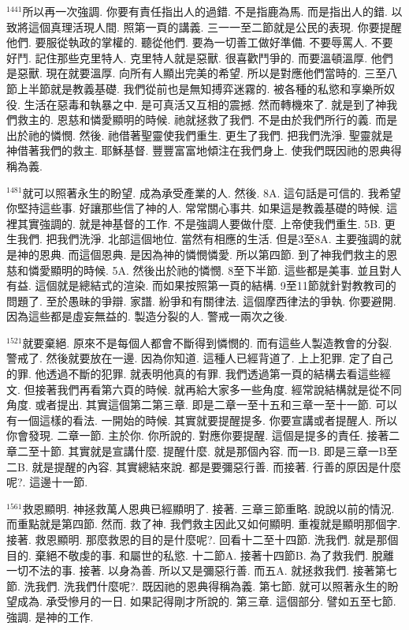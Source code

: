 \documentclass{book}
\begin{document}
$^{1441}$所以再一次強調.
你要有責任指出人的過錯.
不是指鹿為馬.
而是指出人的錯.
以致將這個真理活現人間.
照第一頁的講義.
三一一至二節就是公民的表現.
你要提醒他們.
要服從執政的掌權的.
聽從他們.
要為一切善工做好準備.
不要辱罵人.
不要好鬥.
記住那些克里特人.
克里特人就是惡獸.
很喜歡鬥爭的.
而要溫頓溫厚.
他們是惡獸.
現在就要溫厚.
向所有人顯出完美的希望.
所以是對應他們當時的.
三至八節上半節就是教義基礎.
我們從前也是無知搏弈迷霧的.
被各種的私慾和享樂所奴役.
生活在惡毒和執暴之中.
是可真活又互相的震撼.
然而轉機來了.
就是到了神我們救主的.
恩慈和憐愛顯明的時候.
祂就拯救了我們.
不是由於我們所行的義.
而是出於祂的憐憫.
然後.
祂借著聖靈使我們重生.
更生了我們.
把我們洗淨.
聖靈就是神借著我們的救主.
耶穌基督.
豐豐富富地傾注在我們身上.
使我們既因祂的恩典得稱為義.

$^{1481}$就可以照著永生的盼望.
成為承受產業的人.
然後.
8A.
這句話是可信的.
我希望你堅持這些事.
好讓那些信了神的人.
常常關心事共.
如果這是教義基礎的時候.
這裡其實強調的.
就是神基督的工作.
不是強調人要做什麼.
上帝使我們重生.
5B.
更生我們.
把我們洗淨.
北部這個地位.
當然有相應的生活.
但是3至8A.
主要強調的就是神的恩典.
而這個恩典.
是因為神的憐憫憐愛.
所以第四節.
到了神我們救主的恩慈和憐愛顯明的時候.
5A.
然後出於祂的憐憫.
8至下半節.
這些都是美事.
並且對人有益.
這個就是總結式的渲染.
而如果按照第一頁的結構.
9至11節就針對教教司的問題了.
至於愚昧的爭辯.
家譜.
紛爭和有關律法.
這個摩西律法的爭執.
你要避開.
因為這些都是虛妄無益的.
製造分裂的人.
警戒一兩次之後.

$^{1521}$就要棄絕.
原來不是每個人都會不斷得到憐憫的.
而有這些人製造教會的分裂.
警戒了.
然後就要放在一邊.
因為你知道.
這種人已經背道了.
上上犯罪.
定了自己的罪.
他透過不斷的犯罪.
就表明他真的有罪.
我們透過第一頁的結構去看這些經文.
但接著我們再看第六頁的時候.
就再給大家多一些角度.
經常說結構就是從不同角度.
或者提出.
其實這個第二第三章.
即是二章一至十五和三章一至十一節.
可以有一個這樣的看法.
一開始的時候.
其實就要提醒提多.
你要宣講或者提醒人.
所以你會發現.
二章一節.
主於你.
你所說的.
對應你要提醒.
這個是提多的責任.
接著二章二至十節.
其實就是宣講什麼.
提醒什麼.
就是那個內容.
而一B.
即是三章一B至二B.
就是提醒的內容.
其實總結來說.
都是要彌惡行善.
而接著.
行善的原因是什麼呢?.
這邊十一節.

$^{1561}$救恩顯明.
神拯救萬人恩典已經顯明了.
接著.
三章三節重略.
說說以前的情況.
而重點就是第四節.
然而.
救了神.
我們救主因此又如何顯明.
重複就是顯明那個字.
接著.
救恩顯明.
那麼救恩的目的是什麼呢?.
回看十二至十四節.
洗我們.
就是那個目的.
棄絕不敬虔的事.
和屬世的私慾.
十二節A.
接著十四節B.
為了救我們.
脫離一切不法的事.
接著.
以身為善.
所以又是彌惡行善.
而五A.
就拯救我們.
接著第七節.
洗我們.
洗我們什麼呢?.
既因祂的恩典得稱為義.
第七節.
就可以照著永生的盼望成為.
承受慘月的一日.
如果記得剛才所說的.
第三章.
這個部分.
譬如五至七節.
強調.
是神的工作.
\end{document}
